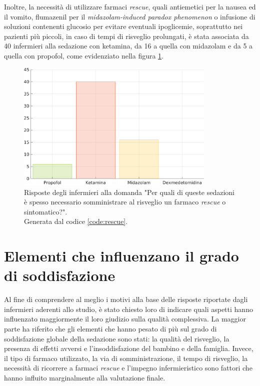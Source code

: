 Inoltre, la necessità di utilizzare farmaci \emph{rescue}, quali antiemetici per la nausea ed il vomito, flumazenil per il \emph{midazolam-induced paradox phenomenon} o infusione di soluzioni contenenti glucosio per evitare eventuali ipoglicemie, soprattutto nei pazienti più piccoli, in caso di tempi di risveglio prolungati, è stata associata da 40 infermieri alla sedazione con ketamina, da 16 a quella con midazolam e da 5 a quella con propofol, come evidenziato nella figura \ref{fig:rescue}.

\begin{figure}[!h]
    \centering
    \includegraphics[width=0.85\textwidth]{Figure/rescue.png}
    \caption{Risposte degli infermieri alla domanda "Per quali di queste sedazioni è spesso necessario somministrare al risveglio un farmaco \emph{rescue} o sintomatico?".\\ Generata dal codice \ref{code:rescue}.}
    \label{fig:rescue}
\end{figure}


\section{Elementi che influenzano il grado di soddisfazione}

Al fine di comprendere al meglio i motivi alla base delle risposte riportate dagli infermieri aderenti allo studio, è stato chiesto loro di indicare quali aspetti hanno influenzato maggiormente il loro giudizio sulla qualità complessiva. La maggior parte ha riferito che gli elementi che hanno pesato di più sul grado di soddisfazione globale della sedazione sono stati: la qualità del risveglio, la presenza di effetti avversi e l'insoddisfazione del bambino e della famiglia. Invece, il tipo di farmaco utilizzato, la via di somministrazione, il tempo di risveglio, la necessità di ricorrere a farmaci \emph{rescue} e l'impegno infermieristico sono fattori che hanno influito marginalmente alla valutazione finale.

